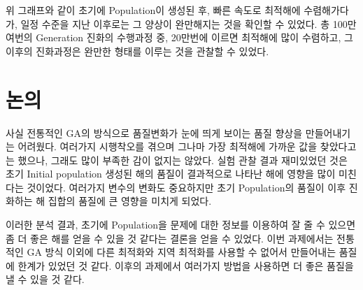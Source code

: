 \documentclass{article}
\begin{document}
위 그래프와 같이 초기에 Population이 생성된 후, 빠른 속도로 최적해에 수렴해가다가, 일정 수준을 지난 이후로는 그 양상이 완만해지는 것을 확인할 수 있었다. 총 100만여번의 Generation 진화의 수행과정 중, 20만번에 이르면 최적해에 많이 수렴하고, 그 이후의 진화과정은 완만한 형태를 이루는 것을 관찰할 수 있었다.


\section{ 논의 }

사실 전통적인 GA의 방식으로 품질변화가 눈에 띄게 보이는 품질 향상을 만들어내기는 어려웠다. 여러가지 시행착오를 겪으며 그나마 가장 최적해에 가까운 값을 찾았다고는 했으나, 그래도 많이 부족한 감이 없지는 않았다. 실험 관찰 결과 재미있었던 것은 초기 Initial population 생성된 해의 품질이 결과적으로 나타난 해에 영향을 많이 미친다는 것이었다. 여러가지 변수의 변화도 중요하지만 초기 Population의 품질이 이후 진화하는 해 집합의 품질에 큰 영향을 미치게 되었다.

이러한 분석 결과, 초기에 Population을 문제에 대한 정보를 이용하여 잘 줄 수 있으면 좀 더 좋은 해를 얻을 수 있을 것 같다는 결론을 얻을 수 있었다. 이번 과제에서는 전통적인 GA 방식 이외에 다른 최적화와 지역 최적화를 사용할 수 없어서 만들어내는 품질에 한계가 있었던 것 같다. 이후의 과제에서 여러가지 방법을 사용하면 더 좋은 품질을 낼 수 있을 것 같다.



\end{document}
